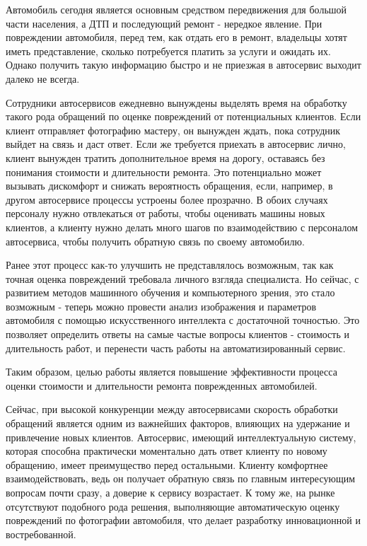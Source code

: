 

Автомобиль сегодня является основным средством передвижения для большой части населения, а ДТП и последующий ремонт - нередкое явление. При повреждении автомобиля, перед тем, как отдать его в ремонт, владельцы хотят иметь представление, сколько потребуется платить за услуги и ожидать их. Однако получить такую информацию быстро и не приезжая в автосервис выходит далеко не всегда.

Сотрудники автосервисов ежедневно вынуждены выделять время на обработку такого рода обращений по оценке повреждений от потенциальных клиентов. Если клиент отправляет фотографию мастеру, он вынужден ждать, пока сотрудник выйдет на связь и даст ответ. Если же требуется приехать в автосервис лично, клиент вынужден тратить дополнительное время на дорогу, оставаясь без понимания стоимости и длительности ремонта. Это потенциально может вызывать дискомфорт и снижать вероятность обращения, если, например, в другом автосервисе процессы устроены более прозрачно. В обоих случаях персоналу нужно отвлекаться от работы, чтобы оценивать машины новых клиентов, а клиенту нужно делать много шагов по взаимодействию с персоналом автосервиса, чтобы получить обратную связь по своему автомобилю.

Ранее этот процесс как-то улучшить не представлялось возможным, так как точная оценка повреждений требовала личного взгляда специалиста. Но сейчас, с развитием методов машинного обучения и компьютерного зрения, это стало возможным - теперь можно провести анализ изображения и параметров автомобиля с помощью искусственного интеллекта с достаточной точностью. Это позволяет определить ответы на самые частые вопросы клиентов - стоимость и длительность работ, и перенести часть работы на автоматизированный сервис.

Таким образом, целью работы является повышение эффективности процесса оценки стоимости и длительности ремонта поврежденных автомобилей. 

Сейчас, при высокой конкуренции между автосервисами скорость обработки обращений является одним из важнейших факторов, влияющих на удержание и привлечение новых клиентов. Автосервис, имеющий интеллектуальную систему, которая способна практически моментально дать ответ клиенту по новому обращению, имеет преимущество перед остальными. Клиенту комфортнее взаимодействовать, ведь он получает обратную связь по главным интересующим вопросам почти сразу, а доверие к сервису возрастает. К тому же, на рынке отсутствуют подобного рода решения, выполняющие автоматическую оценку повреждений по фотографии автомобиля, что делает разработку инновационной и востребованной.
